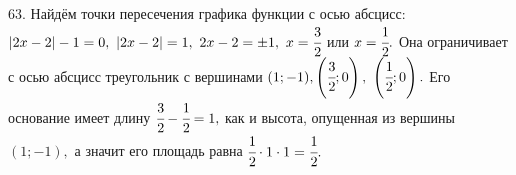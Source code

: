 63. Найдём точки пересечения графика функции с осью абсцисс: $|2x-2|-1=0,\ |2x-2|=1,\ 2x-2=\pm1,\ x=\cfrac{3}{2}$ или $x=\cfrac{1}{2}.$ Она ограничивает с осью абсцисс треугольник с вершинами $(1;-1), \left(\cfrac{3}{2};0\right),\ \left(\cfrac{1}{2};0\right).$ Его основание имеет длину $\cfrac{3}{2}-\cfrac{1}{2}=1,$ как и высота, опущенная из вершины $(1;-1),$ а значит его площадь равна $\cfrac{1}{2}\cdot1\cdot1=\cfrac{1}{2}.$\\
